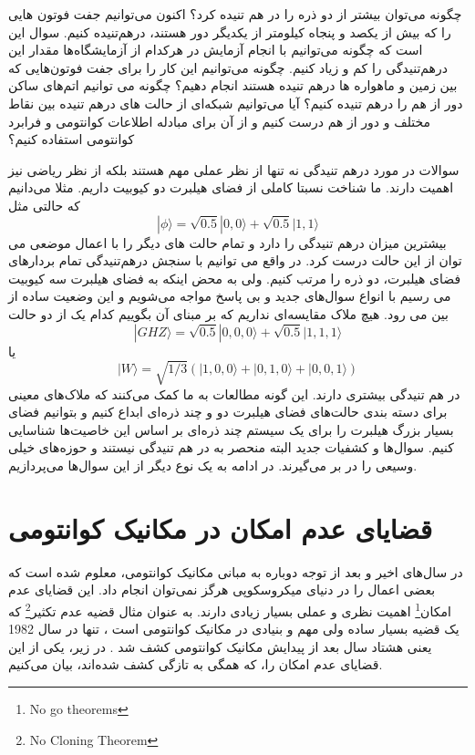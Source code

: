 چگونه می‌توان بیشتر از دو ذره را در هم تنیده کرد؟ اکنون می‌توانیم جفت فوتون هایی را که بیش از یکصد و پنجاه کیلومتر از یکدیگر دور هستند، در‌هم‌تنیده کنیم. سوال این است که چگونه
می‌توانیم با انجام آزمایش در هرکدام از آزمایشگاه‌ها مقدار این درهم‌تنیدگی را کم و زیاد کنیم. 
چگونه می‌توانیم این کار را برای جفت فوتون‌هایی که بین زمین و ماهواره ها درهم تنیده هستند انجام دهیم؟ چگونه می توانیم اتم‌های ساکن دور از هم را درهم تنیده کنیم؟ آیا می‌توانیم شبکه‌ای از حالت های درهم تنیده بین نقاط مختلف و دور از هم درست کنیم و از آن برای مبادله اطلاعات کوانتومی و فرابرد کوانتومی استفاده کنیم؟

سوالات در مورد درهم تنیدگی نه تنها از نظر عملی مهم هستند بلکه از نظر ریاضی نیز اهمیت دارند. ما شناخت نسبتا کاملی از فضای هیلبرت
دو کیوبیت داریم. مثلا می‌دانیم که حالتی مثل
\begin{equation}
	| \phi \rangle = \sqrt{0.5}|0,0\rangle + \sqrt{0.5}|1,1\rangle
\end{equation}
بیشترین میزان درهم تنیدگی را دارد و تمام حالت های دیگر را با اعمال موضعی می توان از این حالت درست کرد. در واقع می توانیم با سنجش
درهم‌تنیدگی تمام بردارهای فضای هیلبرت، دو ذره را مرتب کنیم. ولی به محض اینکه به فضای هیلبرت سه کیوبیت می رسیم با انواع سوال‌های
جدید و بی پاسخ مواجه می‌شویم و این وضعیت ساده از بین می رود. هیچ ملاک مقایسه‌ای نداریم که بر مبنای آن بگوییم کدام یک از دو حالت
\begin{equation}
	| GHZ \rangle = \sqrt{0.5}|0,0,0\rangle + \sqrt{0.5}|1,1,1\rangle
\end{equation}
یا 
\begin{equation}
	| W \rangle = \sqrt{1/3}(|1,0,0\rangle + |0,1,0\rangle +  |0,0,1\rangle )
\end{equation}
در هم تنیدگی بیشتری دارند. این گونه مطالعات به ما کمک می‌کنند که ملاک‌های معینی برای دسته بندی حالت‌های فضای هیلبرت دو و چند
ذره‌ای ابداع کنیم و بتوانیم فضای بسیار بزرگ هیلبرت را برای یک سیستم چند ذره‌ای بر اساس این خاصیت‌ها شناسایی کنیم. سوال‌ها و کشفیات
جدید البته منحصر به در هم تنیدگی نیستند و حوزه‌های خیلی وسیعی را در بر می‌گیرند. در ادامه به یک نوع دیگر از این سوال‌ها می‌پردازیم.
\section{قضایای عدم امکان در مکانیک کوانتومی}
در سال‌های اخیر و بعد از توجه دوباره به مبانی مکانیک کوانتومی، معلوم شده است که بعضی اعمال را در دنیای میکروسکوپی هرگز نمی‌توان
انجام داد. این قضایای عدم امکان\footnote{No go theorems} اهمیت نظری و عملی بسیار زیادی دارند. به عنوان مثال قضیه عدم تکثیر\footnote{No Cloning Theorem} که یک قضیه بسیار ساده
ولی مهم و بنیادی در مکانیک کوانتومی است ، تنها در سال 1982 یعنی هشتاد سال بعد از پیدایش مکانیک کوانتومی کشف شد . در زیر، یکی
از این قضایای عدم امکان را، که همگی به تازگی کشف شده‌اند، بیان می‌کنیم.

